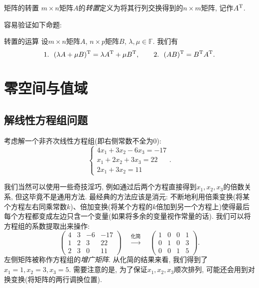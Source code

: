 \begin{definition}{矩阵的转置}
	$m\times n$矩阵$A$的\textit{转置}定义为将其行列交换得到的$n\times m$矩阵, 记作$A^{\operatorname{T}}$. 
\end{definition}

容易验证如下命题: 

\begin{proposition}{转置的运算}
	设$m\times n$矩阵$A$, $n\times p$矩阵$B$, $\lambda ,\mu \in \mathbb{F}$. 我们有$$1.~~(\lambda A + \mu B)^{\operatorname{T}} = \lambda A^{\operatorname{T}} + \mu B^{\operatorname{T}} ,\qquad 2.~~(AB)^{\operatorname{T}}=B^{\operatorname{T}}A^{\operatorname{T}}.$$
\end{proposition}

\newpage
\section{零空间与值域}

\subsection{解线性方程组问题}


考虑解一个非齐次线性方程组(即右侧常数不全为$0$): $$\begin{cases}
	4x_1+3x_2-6x_3=-17 \\ x_1+2x_2+3x_3=22 \\ 2x_1+3x_2 = 11
\end{cases}.$$

我们当然可以使用一些奇技淫巧, 例如通过后两个方程直接得到$x_1,x_2,x_3$的倍数关系, 但这毕竟不是通用方法. 最经典的方法应该是消元: 不断地利用倍乘变换(将某个方程左右同乘常数$k$)、倍加变换(将某个方程的$k$倍加到另一个方程上)使得最后每个方程都变成左边只含一个变量(如果将多余的变量视作常量的话). 我们可以将方程组的系数提取出来操作: $$\left(
\begin{array}{ccc|c}
  4 & 3 & -6 & -17 \\
  1 & 2 & 3 & 22 \\
  2 & 3 & 0 & 11
\end{array}
\right) \quad \stackrel{\textit{化简}}{\longrightarrow} \quad \left(
\begin{array}{ccc|c}
  1 & 0 & 0 & 1 \\
  0 & 1 & 0 & 3 \\
  0 & 0 & 1 & 5
\end{array}
\right).$$
左侧矩阵被称作方程组的\textit{增广矩阵}. 从化简的结果来看, 我们得到了$x_1=1,x_2=3,x_3=5$. 需要注意的是, 为了保证$x_1,x_2,x_3$顺次排列, 可能还会用到对换变换(将矩阵的两行调换位置). 

